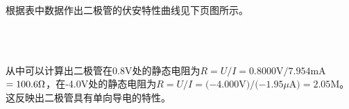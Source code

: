 \documentclass[UTF8]{ctexart}
\begin{document}
根据表中数据作出二极管的伏安特性曲线见下页图所示。

\begin{figure}
\centering
{}
 \\
 \\
\end{figure}

从中可以计算出二极管在0.8V处的静态电阻为$R=U/I=0.8000$V$/7.954$mA$=100.6\ohm$，在-4.0V处的静态电阻为$R=U/I=(-4.000$V$)/(-1.95\mu$A$)=2.05$M\ohm  。这反映出二极管具有单向导电的特性。
\end{document}
